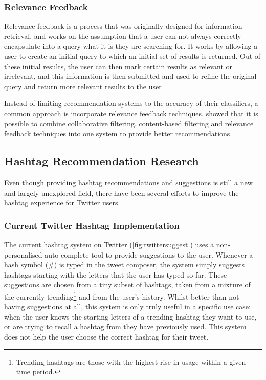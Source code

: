 \documentclass[12pt,a4paper]{article}
\begin{document}
\subsubsection{Relevance Feedback}
Relevance feedback is a process that was originally designed for information retrieval, and works on the assumption that a user can not always correctly encapsulate into a query what it is they are searching for. It works by allowing a user to create an initial query to which an initial set of results is returned. Out of these initial results, the user can then mark certain results as relevant or irrelevant, and this information is then submitted and used to refine the original query and return more relevant results to the user \parencite{Salton:1997}.

Instead of limiting recommendation systems to the accuracy of their classifiers, a common approach is incorporate relevance feedback techniques. \textcite{Utiyama:2006} showed that it is possible to combine collaborative filtering, content-based filtering and relevance feedback techniques into one system to provide better recommendations.

\subsection{Hashtag Recommendation Research}
Even though providing hashtag recommendations and suggestions is still a new and largely unexplored field, there have been several efforts to improve the hashtag experience for Twitter users.

\subsubsection{Current Twitter Hashtag Implementation}
The current hashtag system on Twitter (\autoref{fig:twittersuggest}) uses a non-personalised auto-complete tool to provide suggestions to the user. Whenever a hash symbol (\#) is typed in the tweet composer, the system simply suggests hashtags starting with the letters that the user has typed so far. These suggestions are chosen from a tiny subset of hashtags, taken from a mixture of the currently trending\footnote{Trending hashtags are those with the highest rise in usage within a given time period.} and from the user's history. Whilst better than not having suggestions at all, this system is only truly useful in a specific use case: when the user knows the starting letters of a trending hashtag they want to use, or are trying to recall a hashtag from they have previously used. This system does not help the user choose the correct hashtag for their tweet.
\end{document}
